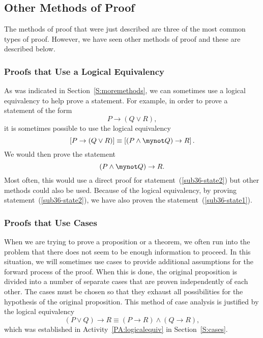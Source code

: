 \subsection*{Other Methods of Proof}
The methods of proof that were just described are three of the most common types of proof.  However, we have seen other methods of proof and these are described below.
\subsubsection*{Proofs that Use a Logical Equivalency}
\setcounter{equation}{0}
As was indicated in Section~\ref{S:moremethods}, we can sometimes use  a logical equivalency to help prove a statement.  For example, in order to prove a statement of the form
\begin{equation}\label{sub36-state1}
P \to \left( {Q \vee R} \right),
\end{equation}
it is sometimes possible to use the logical equivalency
\[\left[ {P \to \left( {Q \vee R} \right)} \right] \equiv \left[ {\left( {P \wedge \mynot  Q} \right) \to R} \right].
\]
We would then prove the statement
\begin{equation} \label{sub36-state2}
\left( {P \wedge \mynot Q} \right) \to R.
\end{equation}
Most often, this would use a direct proof for statement~(\ref{sub36-state2}) but other methods could also be used.  Because of the logical equivalency, by proving statement~(\ref{sub36-state2}), we have also proven the  statement~(\ref{sub36-state1}).

\subsubsection*{Proofs that Use Cases}
%
%
When we are trying to prove a proposition or a theorem, we often run into the problem that there does not seem to be enough information to proceed.  In this situation, we will sometimes use cases to provide additional assumptions for the forward process of the proof.  When this is done, the  original proposition is divided into a number of separate cases that are proven independently of each other.  The cases must be chosen so that they exhaust all possibilities for the hypothesis of the original proposition.  This method of case analysis is justified by the logical equivalency
\[
\left( {P \vee Q} \right) \to R \equiv \left( {P \to R} \right) \wedge \left( {Q \to R} \right),
\]
which was established in \typeu Activity~\ref*{PA:logicalequiv} in Section~\ref{S:cases}.


